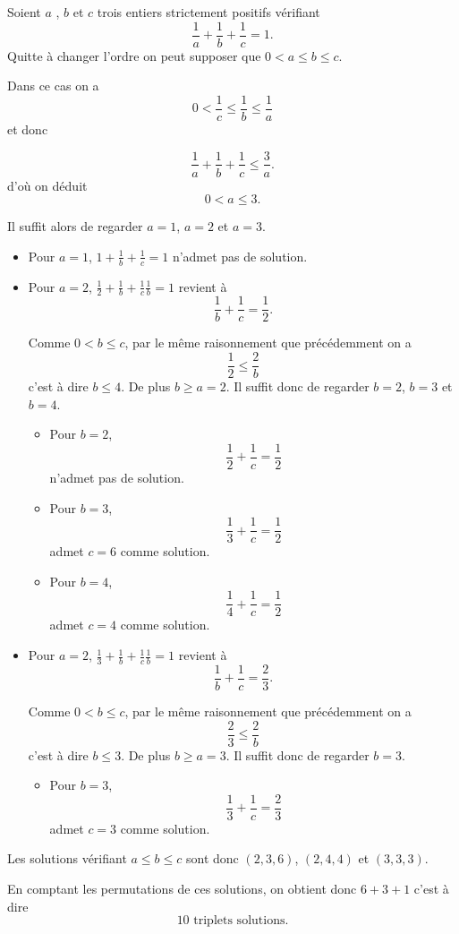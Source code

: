 \begin{sol}
  Soient $a$ , $b$ et $c$ trois entiers strictement positifs vérifiant
  $$\frac{1}{a} + \frac{1}{b} + \frac{1}{c} = 1.$$
  Quitte à changer l'ordre on peut supposer que $0 < a \leq b \leq c$.

  Dans ce cas on a
  $$0 < \frac{1}{c} \leq \frac{1}{b} \leq \frac{1}{a}$$
  et donc

  $$\frac{1}{a} + \frac{1}{b}  + \frac{1}{c}\leq \frac{3}{a}.$$
  d'où on déduit
  $$0 < a \leq 3.$$

  Il suffit alors de regarder $a = 1$, $a=2$ et  $a=3$.

  \begin{itemize}
    \item Pour $a=1$, $1+\frac{1}{b} + \frac{1}{c} = 1$ n'admet pas de solution.
    \item Pour $a=2$, $\frac{1}{2}+\frac{1}{b} + \frac{1}{c} \frac{1}{b}  = 1$ revient à
          $$\frac{1}{b} + \frac{1}{c} = \frac{1}{2}.$$

          Comme $0 < b \leq c$, par le même raisonnement que précédemment on a
          $$\frac{1}{2} \leq \frac{2}{b}$$
          c'est à dire $b \leq 4$. De plus $b \geq a = 2$. Il suffit donc de regarder $b=2$, $b=3$ et $b=4$.
          \begin{itemize}
            \item Pour $b=2$, $$\frac{1}{2} + \frac{1}{c} = \frac{1}{2}$$ n'admet pas de solution.
            \item Pour $b=3$, $$\frac{1}{3} + \frac{1}{c} = \frac{1}{2}$$ admet $c=6$ comme solution.
            \item Pour $b=4$, $$\frac{1}{4} + \frac{1}{c} = \frac{1}{2}$$ admet $c=4$ comme solution.
          \end{itemize}
    \item Pour $a=2$, $\frac{1}{3}+\frac{1}{b} + \frac{1}{c} \frac{1}{b}  = 1$ revient à
          $$\frac{1}{b} + \frac{1}{c} = \frac{2}{3}.$$

          Comme $0 < b \leq c$, par le même raisonnement que précédemment on a
          $$\frac{2}{3} \leq \frac{2}{b}$$
          c'est à dire $b \leq 3$. De plus $b \geq a = 3$. Il suffit donc de regarder $b=3$.
          \begin{itemize}
            \item Pour $b=3$, $$\frac{1}{3} + \frac{1}{c} = \frac{2}{3}$$ admet $c=3$ comme solution.
          \end{itemize}
  \end{itemize}


  Les solutions vérifiant $a \leq b \leq c$ sont donc $(2,3,6)$, $(2,4,4)$ et $(3,3,3)$.

  En comptant les permutations de ces solutions, on obtient donc $6+3+1$ c'est à dire
  $$\boxed{10 \text{ triplets solutions}}.$$
\end{sol}

